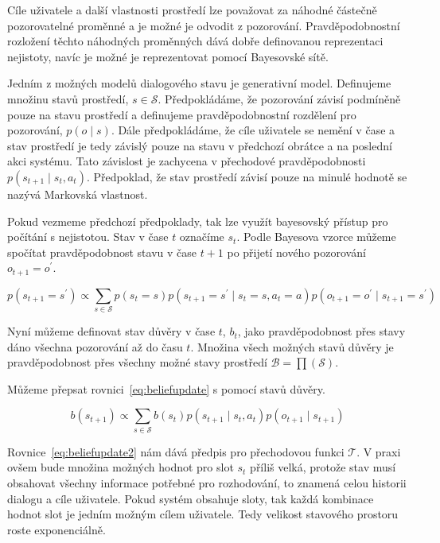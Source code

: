 Cíle uživatele a další vlastnosti prostředí lze považovat za náhodné částečně pozorovatelné proměnné a je možné je odvodit z pozorování.
Pravděpodobnostní rozložení těchto náhodných proměnných dává dobře definovanou reprezentaci nejistoty, navíc je možné je reprezentovat pomocí Bayesovské sítě.

Jedním z možných modelů dialogového stavu je generativní model.
Definujeme množinu stavů prostředí, $s \in \mathcal{S}$.
Předpokládáme, že pozorování závisí podmíněně pouze na stavu prostředí a definujeme pravděpodobnostní rozdělení pro pozorování, $p(o \mid s)$.
Dále předpokládáme, že cíle uživatele se nemění v čase a stav prostředí je tedy závislý pouze na stavu v předchozí obrátce a na poslední akci systému.
Tato závislost je zachycena v přechodové pravděpodobnosti $p(s_{t+1} \mid s_t, a_t)$.
Předpoklad, že stav prostředí závisí pouze na minulé hodnotě se nazývá Markovská vlastnost.

Pokud vezmeme předchozí předpoklady, tak lze využít bayesovský přístup pro počítání s nejistotou.
Stav v čase $t$ označíme $s_t$.
Podle Bayesova vzorce můžeme spočítat pravděpodobnost stavu v čase $t+1$ po přijetí nového pozorování $o_{t+1} = o^\prime$.

\begin{equation}
p(s_{t+1} = s^\prime) \propto
    \sum_{s \in \mathcal{S}}
        p(s_t = s)
        p(s_{t+1} = s^\prime \mid s_t = s, a_t = a) p(o_{t+1} = o^\prime \mid s_{t+1} = s^\prime)
\label{eq:beliefupdate}
\end{equation}

Nyní můžeme definovat stav důvěry v čase $t$, $b_t$, jako pravděpodobnost přes stavy dáno všechna pozorování až do času $t$.
Množina všech možných stavů důvěry je pravděpodobnost přes všechny možné stavy prostředí $\mathcal{B} = \prod(\mathcal{S})$.

Můžeme přepsat rovnici~\eqref{eq:beliefupdate} s pomocí stavů důvěry.

\begin{equation}
b(s_{t+1}) \propto
    \sum_{s \in \mathcal{S}}
        b(s_t)
        p(s_{t+1} \mid s_t, a_t)
        p(o_{t+1} \mid s_{t+1})
\label{eq:beliefupdate2}
\end{equation}

Rovnice~\eqref{eq:beliefupdate2} nám dává předpis pro přechodovou funkci $\mathcal{T}$.
V praxi ovšem bude množina možných hodnot pro slot $s_t$ příliš velká, protože stav musí obsahovat všechny informace potřebné pro rozhodování, to znamená celou historii dialogu a cíle uživatele. 
Pokud systém obsahuje sloty, tak každá kombinace hodnot slot je jedním možným cílem uživatele. 
Tedy velikost stavového prostoru roste exponenciálně.

